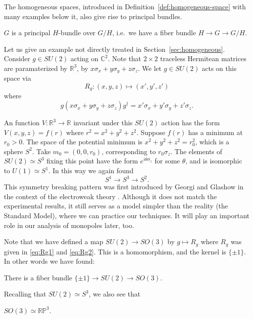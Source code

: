 \documentclass[12pt]{article}
\numberwithin{equation}{section}
\numberwithin{figure}{section}
\theoremstyle{remark}
\def\bC{\mathbb{C}}
\def\bR{\mathbb{R}}
\def\RP{\mathbb{RP}}
\begin{document}
The homogeneous spaces, introduced in Definition~\ref{def:homogeneous-space}
with many examples below it,
also give rise to principal bundles.
\begin{proposition}
  $G$ is a principal $H$-bundle over $G/H$, i.e.~we have a fiber bundle $H\to G\to G/H$.
\end{proposition}

Let us give an example not directly treated in Section~\ref{sec:homogeneous}.
Consider $g\in SU(2)$ acting on $\bC^2$.
Note that $2\times 2$ traceless Hermitean matrices are paramaterized by $\bR^3$,
by $x\sigma_x+y\sigma_y+z\sigma_z$.
We let $g\in SU(2)$ acts on this space via \begin{equation}
R_g: (x,y,z) \mapsto (x',y',z')  \label{eq:Rg1}
\end{equation} where \begin{equation}
g(x\sigma_x+y\sigma_y+z\sigma_z)g^\dagger = x'\sigma_x+y'\sigma_y+z'\sigma_z.
\label{eq:Rg2}
\end{equation}

An function $V:\bR^3\to \bR$ invariant under this $SU(2)$ action 
has the form $V(x,y,z)=f(r)$ where $r^2={x^2+y^2+z^2}$.
Suppose $f(r)$ has a minimum at $r_0>0$.
The space of the potential minimum is $x^2+y^2+z^2=r_0^2$, which is a sphere $S^2$.
Take $m_0=(0,0,r_0)$, corresponding to $r_0 \sigma_z$.
The elements of $SU(2)\simeq S^3$ fixing this point have the form $e^{i\theta \sigma_z}$ for some $\theta$,
and is isomorphic to $U(1)\simeq S^1$.
In this way we again found \begin{equation}
  S^1 \to S^3 \to S^2.
\end{equation}
This symmetry breaking pattern was first introduced by Georgi and Glashow in the context of the electroweak theory \cite{Georgi:1972cj}.
Although it does not match the experimental results,
it still serves as a model simpler than the reality (the Standard Model),
where we can practice our techniques. 
It will play an important role in our analysis of monopoles later, too.

Note that we have defined a map $SU(2)\to SO(3)$ by $g\mapsto R_g$ where $R_g$ was given in \eqref{eq:Rg1} and \eqref{eq:Rg2}.
This is a homomorphism, and the kernel is $\{\pm 1\}$.
In other words we have found:
\begin{example}
  There is a fiber bundle $
    \{\pm 1\} \to SU(2) \to SO(3). 
  $
\end{example}
Recalling that $SU(2)\simeq S^3$, we also see that 
\begin{proposition}
$SO(3)\simeq \RP^3$.  
\end{proposition}
\end{document}
